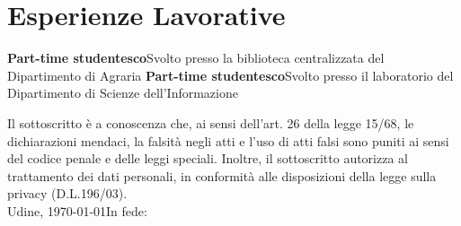 \documentclass[10pt,a4paper]{moderncv}
\begin{document}
\section{Esperienze Lavorative}
 {\textbf{Part-time studentesco}\newline Svolto presso la biblioteca centralizzata del Dipartimento di Agraria}
 {\textbf{Part-time studentesco}\newline Svolto presso il laboratorio del Dipartimento di Scienze dell'Informazione}

%
%    

\vspace{\fill} 
{\footnotesize\noindent 
Il sottoscritto è a conoscenza che, ai sensi dell'art. 26 della legge 15/68, le dichiarazioni mendaci, la falsità negli atti e l'uso di atti falsi sono puniti ai sensi del codice penale e delle leggi speciali. Inoltre, il sottoscritto autorizza al trattamento dei dati personali, in conformità alle disposizioni della legge sulla privacy  (D.L.196/03).}
\vspace*{0.8cm}\\
Udine, \today\hfill In fede: %
\makebox[9cm]{\dotfill}
\end{document}
